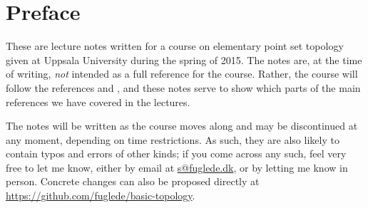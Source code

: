 \section{Preface}
\label{preface}
These are lecture notes written for a course on elementary point set topology given at Uppsala University during the spring of 2015. The notes are, at the time of writing, \emph{not} intended as a full reference for the course. Rather, the course will follow the references \cite{Mun} and \cite{Fje}, and these notes serve to show which parts of the main references we have covered in the lectures.

The notes will be written as the course moves along and may be discontinued at any moment, depending on time restrictions. As such, they are also likely to contain typos and errors of other kinds; if you come across any such, feel very free to let me know, either by email at \href{mailto:s@fuglede.dk}{\textsf{s@fuglede.dk}}, or by letting me know in person. Concrete changes can also be proposed directly at \href{https://github.com/fuglede/basic-topology}{\textsf{https://github.com/fuglede/basic-topology}}.
